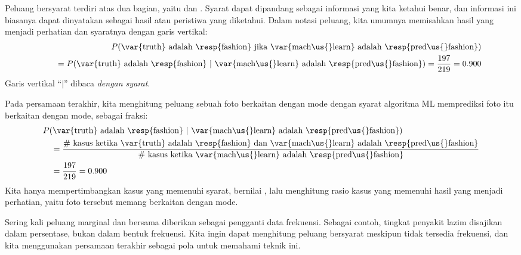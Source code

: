 Peluang bersyarat terdiri atas dua bagian,
yaitu  dan .
Syarat dapat dipandang sebagai informasi yang kita ketahui
benar, dan informasi ini biasanya dapat dinyatakan sebagai
hasil atau peristiwa yang diketahui.
Dalam notasi peluang, kita umumnya memisahkan
hasil yang menjadi perhatian dan syaratnya dengan
garis vertikal:
\begin{align*}
&& P(\text{\var{truth} adalah \resp{fashion} jika
    \var{mach\us{}learn} adalah \resp{pred\us{}fashion}}) \\
&& \quad = P(\text{\var{truth} adalah \resp{fashion}\ }|
    \text{\ \var{mach\us{}learn} adalah \resp{pred\us{}fashion}})
  = \frac{\fashYY{}}{\fashYA{}}
  = 0.900
\end{align*}
Garis vertikal ``$|$'' dibaca \emph{dengan syarat}.

\D{\newpage}

Pada persamaan terakhir, kita menghitung peluang sebuah foto
berkaitan dengan mode dengan syarat algoritma ML
memprediksi foto itu berkaitan dengan mode, sebagai fraksi:
\begin{align*}
& P(\text{\var{truth} adalah \resp{fashion}\ }|
    \text{\ \var{mach\us{}learn} adalah \resp{pred\us{}fashion}}) \\
  &\quad = \frac{\text{\# kasus ketika \var{truth} adalah \resp{fashion}
       dan \var{mach\us{}learn} adalah \resp{pred\us{}fashion}}}
     {\text{\# kasus ketika \var{mach\us{}learn} adalah \resp{pred\us{}fashion}}} \\
  &\quad = \frac{\fashYY{}}{\fashYA{}}
      = 0.900
\end{align*}
Kita hanya mempertimbangkan kasus yang memenuhi syarat,
 bernilai , lalu
menghitung rasio kasus yang memenuhi
hasil yang menjadi perhatian, yaitu foto tersebut memang berkaitan dengan mode.

Sering kali peluang marginal dan bersama diberikan
sebagai pengganti data frekuensi.
Sebagai contoh, tingkat penyakit lazim disajikan dalam persentase,
bukan dalam bentuk frekuensi.
Kita ingin dapat menghitung peluang bersyarat
meskipun tidak tersedia frekuensi, dan kita menggunakan persamaan terakhir
sebagai pola untuk memahami teknik ini.

